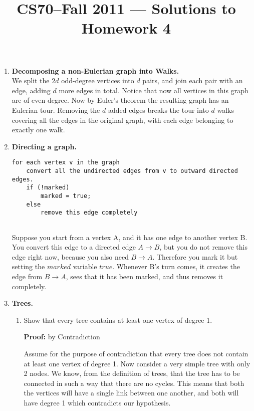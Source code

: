 \documentclass[11pt]{article}
\title{CS70--Fall 2011 --- Solutions to Homework 4}
\newcommand{\cmark}{\ding{51}}%
\begin{document}
	\maketitle
	
	\begin{enumerate}
		\item \textbf{Decomposing a non-Eulerian graph into Walks.} \\
		We split the $2d$ odd-degree vertices into $d$ pairs, and join each pair with an edge, adding $d$ more edges in total. Notice that now all vertices in this graph are of even degree. Now by Euler’s theorem the resulting graph has an Eulerian tour. Removing the $d$ added edges breaks the tour into $d$ walks covering all the edges in the original graph, with each edge belonging to exactly one walk.
		
		\item \textbf{Directing a graph.}

\begin{lstlisting}
for each vertex v in the graph 
	convert all the undirected edges from v to outward directed edges. 
	if (!marked)
		marked = true;
	else
		remove this edge completely 
	
\end{lstlisting}

	Suppose you start from a vertex A, and it has one edge to another vertex B. You convert this edge to a directed edge $A \rightarrow B$, but you do not remove this edge right now, because you also need $B \rightarrow A$. Therefore you mark it but setting the $marked$ variable $true$. Whenever B's turn comes, it creates the edge from $B \rightarrow A$, sees that it has been marked, and thus removes it completely. 

			
		
		\item \textbf{Trees.}
			\begin{enumerate}
				\item Show that every tree contains at least one vertex of degree 1.
				
				\textbf{Proof: } by Contradiction
				
				Assume for the purpose of contradiction that every tree does not contain at least one vertex of degree 1. Now consider a very simple tree with only 2 nodes. We know, from the definition of trees, that the tree has to be connected in such a way that there are no cycles. This means that both the vertices will have a single link between one another, and both will have degree 1 which contradicts our hypothesis. \cmark
				

\end{enumerate}
\end{enumerate}
\end{document}
